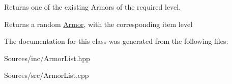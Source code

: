 Returns one of the existing Armors of the required level. 

Returns a random \hyperlink{class_armor}{Armor}, with the corresponding item level 

The documentation for this class was generated from the following files\+:\begin{DoxyCompactItemize}
\item 
Sources/inc/Armor\+List.\+hpp\item 
Sources/src/Armor\+List.\+cpp\end{DoxyCompactItemize}
